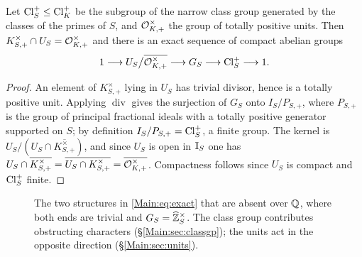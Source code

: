 \begin{proposition}\label{Main:prop:GSstructure}
Let $\operatorname{Cl}^+_S\le\operatorname{Cl}^+_K$ be the subgroup of the narrow class group generated by
the classes of the primes of $S$, and $\mathcal{O}^\times_{K,+}$ the group of totally
positive units. Then $K^\times_{S,+}\cap U_S=\mathcal{O}^\times_{K,+}$ and there is an
exact sequence of compact abelian groups
\begin{equation}\label{Main:eq:exact}
1\longrightarrow U_S\big/\overline{\mathcal{O}^\times_{K,+}}\longrightarrow G_S\longrightarrow\operatorname{Cl}^+_S\longrightarrow1 .
\end{equation}
\end{proposition}

\begin{proof}
An element of $K^\times_{S,+}$ lying in $U_S$ has trivial divisor, hence is a
totally positive unit. Applying $\operatorname{div}$ gives the surjection of
$G_S$ onto $I_S/P_{S,+}$, where $P_{S,+}$ is the group of principal fractional
ideals with a totally positive generator supported on $S$; by definition
$I_S/P_{S,+}=\operatorname{Cl}^+_S$, a finite group. The kernel is
$U_S/(U_S\cap\overline{K^\times_{S,+}})$, and since $U_S$ is open in $\mathbb{I}_S$ one has
$U_S\cap\overline{K^\times_{S,+}}=\overline{U_S\cap K^\times_{S,+}}=\overline{\mathcal{O}^\times_{K,+}}$.
Compactness follows since $U_S$ is compact and $\operatorname{Cl}^+_S$ finite.
\end{proof}

\begin{figure}[htbp]
\centering
{}
\caption{The two structures in \eqref{Main:eq:exact} that are absent over $\mathbb{Q}$, where both
ends are trivial and $G_S=\widehat{\mathbb{Z}}_S^\times$. The class group contributes obstructing
characters (\S\ref{Main:sec:classgp}); the units act in the opposite direction
(\S\ref{Main:sec:units}).}
\label{Main:fig:exact}
\end{figure}

